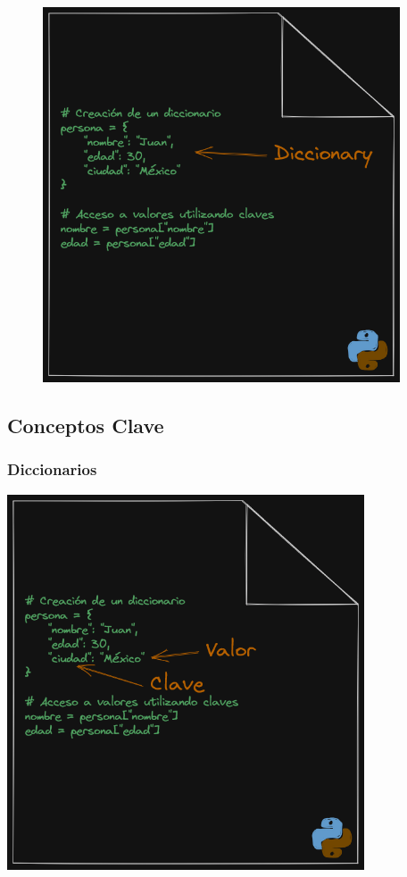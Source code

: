 \documentclass[
  a4paper,
  DIV=11,
  numbers=noendperiod,
  onepage,
  openany]{scrreprt}
\begin{document}
\begin{figure}

{\centering \includegraphics[width=4.16667in,height=\textheight]{unidades/unidad3/images/diccionary.png}

}

\end{figure}

\subsection{Conceptos Clave}\label{conceptos-clave-9}

\subsubsection{Diccionarios}\label{diccionarios-1}

\includegraphics[width=4.16667in,height=\textheight]{unidades/unidad3/images/diccionary001.png}
\end{document}
